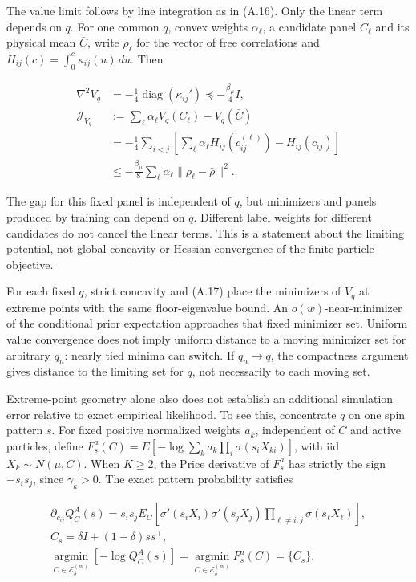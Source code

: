 \documentclass{article}
\begin{document}
The value limit follows by line integration as in (A.16). Only the
linear term depends on \(q\). For one common \(q\), convex weights
\(\alpha_\ell\), a candidate panel \(C_\ell\) and its physical mean
\(\bar C\), write \(\rho_\ell\) for the vector of free correlations and
\(H_{ij}(c)=\int_0^c\kappa_{ij}(u)\,du\). Then

\[
\begin{aligned}
\nabla^2V_q&=-\tfrac14\operatorname{diag}(\kappa_{ij}')
\preceq-\tfrac{\beta_\mu}{4}I,\\
\mathcal J_{V_q}
&:=\sum_\ell\alpha_\ell V_q(C_\ell)-V_q(\bar C)\\
&=-\tfrac14\sum_{i<j}\left[
\sum_\ell\alpha_\ell H_{ij}(c_{ij}^{(\ell)})-H_{ij}(\bar c_{ij})\right]\\
&\le-\tfrac{\beta_\mu}{8}\sum_\ell\alpha_\ell
\|\rho_\ell-\bar\rho\|^2.
\end{aligned}
\tag{A.34}
\]

The gap for this fixed panel is independent of \(q\), but minimizers and
panels produced by training can depend on \(q\). Different label weights
for different candidates do not cancel the linear terms. This is a
statement about the limiting potential, not global concavity or Hessian
convergence of the finite-particle objective.

For each fixed \(q\), strict concavity and (A.17) place the minimizers
of \(V_q\) at extreme points with the same floor-eigenvalue bound. An
\(o(w)\)-near-minimizer of the conditional prior expectation approaches
that fixed minimizer set. Uniform value convergence does not imply
uniform distance to a moving minimizer set for arbitrary \(q_n\): nearly
tied minima can switch. If \(q_n\to q\), the compactness argument gives
distance to the limiting set for \(q\), not necessarily to each moving
set.

Extreme-point geometry alone also does not establish an additional
simulation error relative to exact empirical likelihood. To see this,
concentrate \(q\) on one spin pattern \(s\). For fixed positive
normalized weights \(a_k\), independent of \(C\) and active particles,
define \(F_s^a(C)=E[-\log\sum_k a_k\prod_i\sigma(s_iX_{ki})]\), with iid
\(X_k\sim N(\mu,C)\). When \(K\ge2\), the Price derivative of \(F_s^a\)
has strictly the sign \(-s_is_j\), since \(\gamma_k>0\). The exact
pattern probability satisfies

\[
\begin{gathered}
\partial_{c_{ij}}Q_C^A(s)=s_is_jE_C\left[
\sigma'(s_iX_i)\sigma'(s_jX_j)
\prod_{\ell\ne i,j}\sigma(s_\ell X_\ell)\right],\\
C_s=\delta I+(1-\delta)ss^\top,\\
\operatorname*{argmin}_{C\in\mathcal E_\delta^{(m)}}[-\log Q_C^A(s)]
=\operatorname*{argmin}_{C\in\mathcal E_\delta^{(m)}}F_s^a(C)=\{C_s\}.
\end{gathered}
\tag{A.35}
\]
\end{document}
